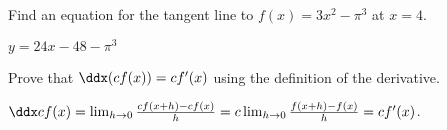 \begin{exercises}
\begin{exercise} 
  Find an equation for the tangent line to $f(x)= 3x^2 - \pi ^3$ at
  $x= 4$.
\begin{answer} $y=24x-48-\pi^3$
\end{answer}
\end{exercise}



 
\begin{exercise} Prove that $\ddx(cf(x))= cf'(x)$ using the
definition of the derivative.
\end{exercise}
\begin{answer} 
$\ddx cf(x) = \lim_{h\to 0}\frac{cf(x+h)-cf(x)}{h} = c\lim_{h\to 0}\frac{f(x+h)-f(x)}{h} = cf'(x)$.
\end{answer}
\end{exercises}
